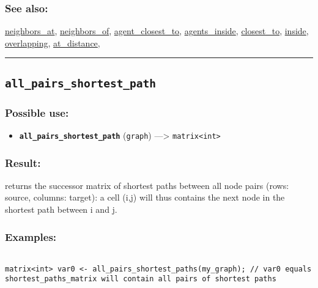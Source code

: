 \documentclass[]{book}
\providecommand{\tightlist}{%
  \setlength{\itemsep}{0pt}\setlength{\parskip}{0pt}}
\theoremstyle{definition}
\theoremstyle{definition}
\theoremstyle{definition}
\theoremstyle{remark}
\begin{document}
\subsubsection{See also:}\label{see-also-23}

\href{OperatorsNR\#neighbors_at}{neighbors\_at},
\href{OperatorsNR\#neighbors_of}{neighbors\_of},
\href{OperatorsAA\#agent_closest_to}{agent\_closest\_to},
\href{OperatorsAA\#agents_inside}{agents\_inside},
\href{OperatorsBC\#closest_to}{closest\_to},
\href{OperatorsIM\#inside}{inside},
\href{OperatorsNR\#overlapping}{overlapping},
\href{OperatorsAA\#at_distance}{at\_distance},

\begin{center}\rule{0.5\linewidth}{\linethickness}\end{center}

\subsection{\texorpdfstring{\texttt{all\_pairs\_shortest\_path}}{all\_pairs\_shortest\_path}}\label{all_pairs_shortest_path}

\subsubsection{Possible use:}\label{possible-use-32}

\begin{itemize}
\tightlist
\item
  \textbf{\texttt{all\_pairs\_shortest\_path}} (\texttt{graph})
  ---\textgreater{} \texttt{matrix\textless{}int\textgreater{}}
\end{itemize}

\subsubsection{Result:}\label{result-31}

returns the successor matrix of shortest paths between all node pairs
(rows: source, columns: target): a cell (i,j) will thus contains the
next node in the shortest path between i and j.

\subsubsection{Examples:}\label{examples-25}

\begin{verbatim}
 
matrix<int> var0 <- all_pairs_shortest_paths(my_graph); // var0 equals shortest_paths_matrix will contain all pairs of shortest paths
\end{verbatim}
\end{document}
